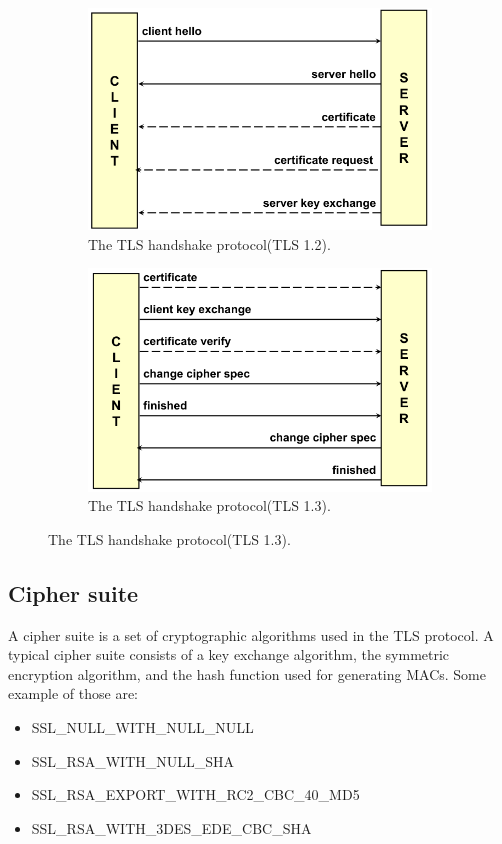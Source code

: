 \documentclass{report}
\begin{document}
\begin{figure}[H]
  \centering
  \begin{subfigure}{.5\textwidth}
    \centering
    \includegraphics[width=.9\linewidth]{img/TLS key echange.png}
    \caption{The TLS handshake protocol(TLS 1.2).}
    \label{fig:tls-handshake-protocol-1.2}
  \end{subfigure}%
  \begin{subfigure}{.5\textwidth}
    \centering
    \includegraphics[width=.9\linewidth]{img/TLS key exchange 1-3.png}
    \caption{The TLS handshake protocol(TLS 1.3).}
    \label{fig:tls-handshake-protocol-1.3}
  \end{subfigure}
\end{figure}

\subsection{Cipher suite}
A cipher suite is a set of cryptographic algorithms used in the TLS
protocol. A typical cipher suite consists of a key exchange algorithm,
the symmetric encryption algorithm, and the hash function used for 
generating MACs.
Some example of those are:
\begin{itemize}
  \item SSL\_NULL\_WITH\_NULL\_NULL
  \item SSL\_RSA\_WITH\_NULL\_SHA
  \item SSL\_RSA\_EXPORT\_WITH\_RC2\_CBC\_40\_MD5
  \item SSL\_RSA\_WITH\_3DES\_EDE\_CBC\_SHA
\end{itemize}
\end{document}
